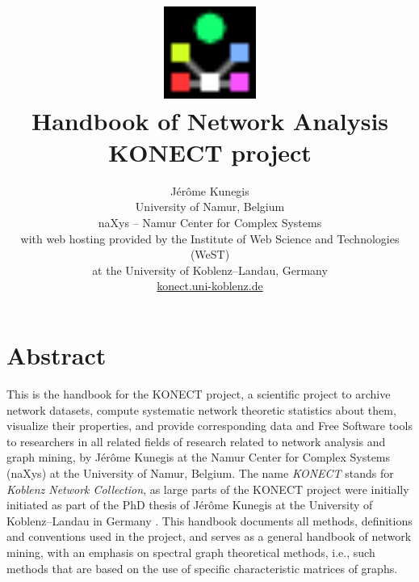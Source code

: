\documentclass{article}
\begin{document}
\title{
  \includegraphics[width=3cm]{konect-logo} \\
  \vspace{1cm}
         {\Huge Handbook of Network Analysis} \\
         KONECT project
}

\author{
  Jérôme Kunegis \\
  University of Namur, Belgium \\
  naXys -- Namur Center for Complex Systems \\
  {\small with web hosting provided by the Institute of Web Science and
    Technologies (WeST)} \\ 
  {\small at the University of Koblenz--Landau, Germany} \\
  {\small \href{http://konect.uni-koblenz.de/}{konect.uni-koblenz.de}}
}

\maketitle

\section*{Abstract}
This is the handbook for the KONECT project, a scientific project to
archive network datasets, compute systematic network theoretic
statistics about them, visualize their properties, and provide
corresponding data and Free Software tools to researchers in all related
fields of research related to network analysis and graph mining, by
Jérôme Kunegis at the Namur Center for Complex Systems (naXys) at the
University of Namur, Belgium.  The name \emph{KONECT} stands for
\emph{Koblenz Network Collection}, as large parts of the KONECT project
were initially initiated as part of the PhD thesis of Jérôme Kunegis at
the University of Koblenz--Landau in Germany \citeyearpar{kunegis:phd}.  This handbook
documents all methods, definitions and conventions used in the project,
and serves as a general handbook of network mining, with an emphasis on
spectral graph theoretical methods, i.e., such methods that are based on
the use of specific characteristic matrices of graphs. 
\end{document}
